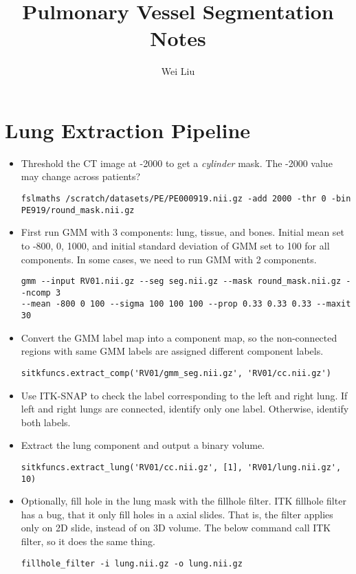 \documentclass[11pt]{article}
\begin{document}
\title{Pulmonary Vessel Segmentation Notes}
\author{Wei Liu}
\maketitle

\section{Lung Extraction Pipeline}
\begin{itemize}
\item Threshold the CT image at -2000 to get a \emph{cylinder} mask. The -2000
  value may change across patients?

\begin{Verbatim}[frame=single]
fslmaths /scratch/datasets/PE/PE000919.nii.gz -add 2000 -thr 0 -bin
PE919/round_mask.nii.gz
\end{Verbatim}

\item First run GMM with 3 components: lung, tissue, and bones. Initial
mean set to -800, 0, 1000, and initial standard deviation of GMM set to 100
for all components.  In some cases, we need to run GMM with 2 components.
\begin{Verbatim}[frame=single]
gmm --input RV01.nii.gz --seg seg.nii.gz --mask round_mask.nii.gz --ncomp 3
--mean -800 0 100 --sigma 100 100 100 --prop 0.33 0.33 0.33 --maxit 30
\end{Verbatim}
\item Convert the GMM label map into a component map, so the non-connected
  regions with same GMM labels are assigned different component labels.
\begin{Verbatim}[frame=single]
sitkfuncs.extract_comp('RV01/gmm_seg.nii.gz', 'RV01/cc.nii.gz')
\end{Verbatim}
\item Use ITK-SNAP to check the label corresponding to the left and right
  lung. If left and right lungs are connected, identify only one
  label. Otherwise, identify both labels. 

\item Extract the lung component and output a binary volume.

\begin{Verbatim}[frame=single]
sitkfuncs.extract_lung('RV01/cc.nii.gz', [1], 'RV01/lung.nii.gz', 10)
\end{Verbatim}

\item Optionally, fill hole in the lung mask with the fillhole filter. ITK
  fillhole filter has a bug, that it only fill holes in a axial slides. That
  is, the filter applies only on 2D slide, instead of on 3D volume. The below
  command call ITK filter, so it does the same thing. 

\begin{Verbatim}[frame=single]
fillhole_filter -i lung.nii.gz -o lung.nii.gz
\end{Verbatim}

\end{itemize}
\end{document}
